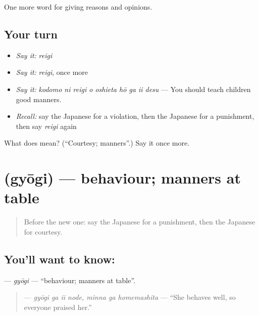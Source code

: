 \begin{grammarlens}[title={What you've built}]
One more word for giving reasons and opinions.
\end{grammarlens}

\subsection*{Your turn}
\begin{itemize}
\raggedright
  \item \emph{Say it:} \emph{reigi}
  \item \emph{Say it:} \emph{reigi}, once more
  \item \emph{Say it:} \emph{kodomo ni reigi o oshieta hō ga ii desu} — You should teach children good manners.
  \item \emph{Recall:} say the Japanese for a violation, then the Japanese for a punishment, then say \emph{reigi} again
\end{itemize}

\begin{tcolorbox}[breakable,colback=teal!4,colframe=teal!35!black,title={Before you move on}]
What does  mean? (\textquotedblleft{}Courtesy; manners\textquotedblright{}.) Say it once more.
\end{tcolorbox}
\section[\texorpdfstring{\ja{ぎょうぎ} (gyōgi)}{ぎょうぎ (gyōgi)}]{ (gyōgi) — behaviour; manners at table}

\label{lesson:JA-C327-gyougi}



\begin{quote}
Before the new one: say the Japanese for a punishment, then the Japanese for courtesy.
\end{quote}

\subsection*{You'll want to know: }
\textbf{} — \emph{gyōgi} — \textquotedblleft{}behaviour; manners at table\textquotedblright{}.

\begin{quote}
\textbf{  } — \emph{gyōgi ga ii node, minna ga homemashita} — \textquotedblleft{}She behaves well, so everyone praised her.\textquotedblright{}
\end{quote}

